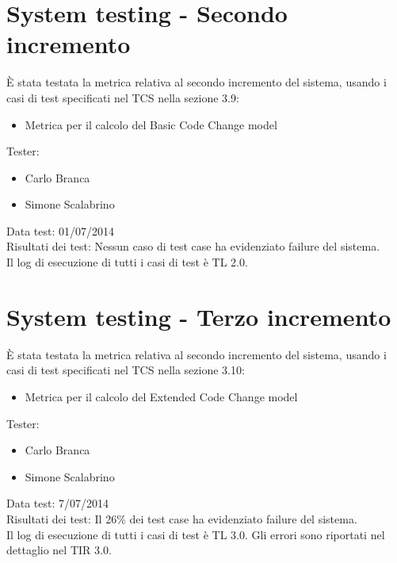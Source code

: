 \section{System testing - Secondo incremento}
È stata testata la metrica relativa al secondo incremento del sistema, usando i casi di test specificati nel TCS nella sezione 3.9:
\begin{itemize}
 \item Metrica per il calcolo del Basic Code Change model
\end{itemize}
Tester:
\begin{itemize}
\item Carlo Branca
\item Simone Scalabrino
\end{itemize}
Data test: 01/07/2014\\
Risultati dei test: Nessun caso di test case ha evidenziato failure del sistema.\\
Il log di esecuzione di tutti i casi di test è TL 2.0.

\section{System testing - Terzo incremento}
È stata testata la metrica relativa al secondo incremento del sistema, usando i casi di test specificati nel TCS nella sezione 3.10:
\begin{itemize}
 \item Metrica per il calcolo del Extended Code Change model
\end{itemize}
Tester:
\begin{itemize}
\item Carlo Branca
\item Simone Scalabrino
\end{itemize}
Data test: 7/07/2014\\
Risultati dei test: Il 26\% dei test case ha evidenziato failure del sistema.\\
Il log di esecuzione di tutti i casi di test è TL 3.0. Gli errori sono riportati nel dettaglio nel TIR 3.0.


